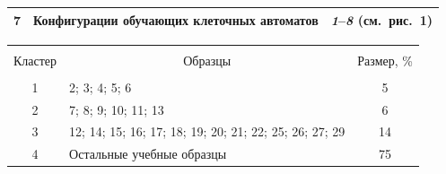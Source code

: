 \begin{description}
\begin{table}
\begin{center}
\begin{tabular}{|c|l|l|}
7&Конфигурации обучающих клеточных автоматов&\textit{1}--\textit{8} (см.\ рис.~1)\\


\hline


\end{tabular}


\end{center}








\begin{center}




\vspace*{2ex}





\begin{tabular}{|c|l|c|}


\hline


&&\\[-9pt]


Кластер&\multicolumn{1}{c|}{Образцы}&\multicolumn{1}{c|}{Размер, \%}\\


\hline


&&\\[-9pt]


1&2; 3; 4; 5; 6&5\\


2&7; 8; 9; 10; 11; 13&6\\


3&12; 14; 15; 16; 17; 18; 19; 20; 21; 22; 25; 26; 27; 29&14\hphantom{9}\\


4&Остальные учебные образцы&75\hphantom{9}\\


\hline


\end{tabular}


\end{center}


\vspace*{-2pt}


\end{table}












\end{description}
